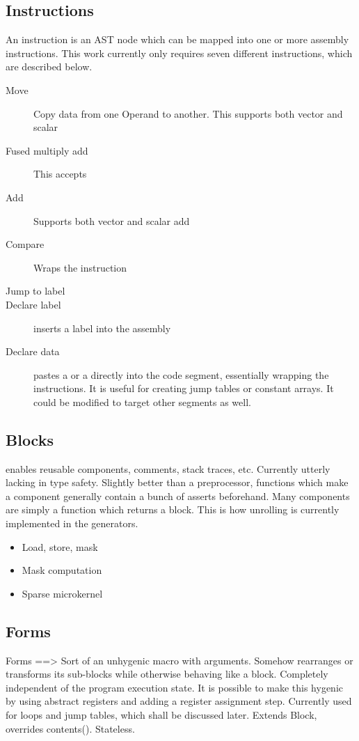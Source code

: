 \subsection{Instructions}

An instruction is an AST node which can be mapped into one or more assembly instructions. This work currently only requires seven different instructions, which are described below. 

\begin{description}
  \item [Move] Copy data from one Operand to another. This supports both vector and scalar 
  \item [Fused multiply add] This accepts 
  \item [Add] Supports both vector and scalar add
  \item [Compare] Wraps the  instruction
  \item [Jump to label] 
  \item [Declare label]  inserts a label into the assembly
  \item [Declare data]  pastes a  or a  directly into the code segment, essentially wrapping the  instructions. It is useful for creating jump tables or constant arrays. It could be modified to target other segments as well.
\end{description}

\subsection{Blocks}
enables reusable components, comments, stack traces, etc. Currently utterly lacking in type safety. Slightly better than a preprocessor, functions which make a component generally contain a bunch of asserts beforehand. Many components are simply a function which returns a block. This is how unrolling is currently implemented in the generators.

\begin{itemize}
  \item Load, store, mask
  \item Mask computation
  \item Sparse microkernel
\end{itemize}

\subsection{Forms}
Forms ==> Sort of an unhygenic macro with arguments. Somehow rearranges or transforms its sub-blocks while otherwise behaving like a block. Completely independent of the program execution state. It is possible to make this hygenic by using abstract registers and adding a register assignment step. Currently used for loops and jump tables, which shall be discussed later. Extends Block, overrides contents(). Stateless.

